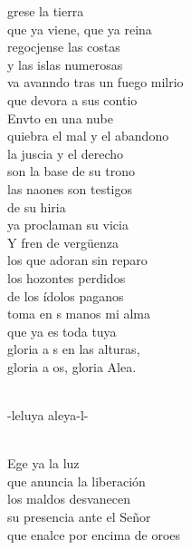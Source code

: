 \documentclass[12pt]{article}
\begin{document}
\begin{multicols*}{2}
\begin{cancion}%
	grese la tierra  \\
que ya viene, que ya reina\\
	regocjense las costas \\
y las islas numerosas\\
	va avanndo tras un fuego milrio\\
	que devora a sus contio\\
\jump
	Envto en una nube \\
quiebra el mal y el abandono\\
	la juscia y el derecho \\
son la base de su trono\\
	las naones son testigos \\
	de su hiria\\
	ya proclaman su vicia\\
\jump
	Y fren de vergüenza \\
los que adoran sin reparo\\
	los hozontes perdidos \\
de los ídolos paganos\\
	toma en s manos mi alma \\
	que ya es toda tuya\\
	gloria a s en las alturas, \\
	gloria a os, gloria Alea.\\\jump\\
	\begin{chorus}%
	-leluya aleya-l-\\
	\end{chorus}%
	\jump\\
	Ege ya la luz \\
que anuncia la liberación\\
	los maldos desvanecen \\
su presencia ante el Señor\\
	que enalce por encima de oroes\\

\end{cancion}
\end{multicols*}
\end{document}
